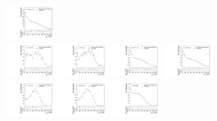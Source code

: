 \begin{figure}[htbp]
  \includegraphics[width=0.2\textwidth]{fig/analysisAppendix/templateVsReco_nonRes_r0_MJ_e_LP_nobb_LDy.pdf}\\
  \includegraphics[width=0.2\textwidth]{fig/analysisAppendix/templateVsReco_nonRes_r0_MJ_mu_HP_vbf_LDy.pdf}
  \includegraphics[width=0.2\textwidth]{fig/analysisAppendix/templateVsReco_nonRes_r0_MJ_e_HP_vbf_LDy.pdf}
  \includegraphics[width=0.2\textwidth]{fig/analysisAppendix/templateVsReco_nonRes_r0_MJ_mu_LP_vbf_LDy.pdf}
  \includegraphics[width=0.2\textwidth]{fig/analysisAppendix/templateVsReco_nonRes_r0_MJ_e_LP_vbf_LDy.pdf}\\
  \includegraphics[width=0.2\textwidth]{fig/analysisAppendix/templateVsReco_nonRes_r0_MJ_mu_HP_bb_HDy.pdf}
  \includegraphics[width=0.2\textwidth]{fig/analysisAppendix/templateVsReco_nonRes_r0_MJ_e_HP_bb_HDy.pdf}
  \includegraphics[width=0.2\textwidth]{fig/analysisAppendix/templateVsReco_nonRes_r0_MJ_mu_LP_bb_HDy.pdf}

\end{figure}
